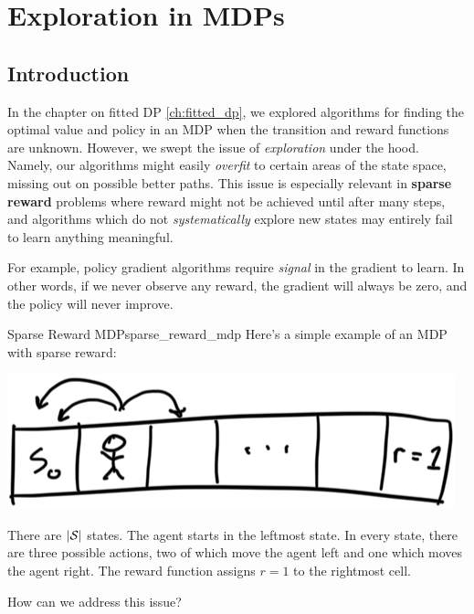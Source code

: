 \documentclass[\main/main]{subfiles}
\begin{document}
\tableofcontents

\chapter{Exploration in MDPs}

\section{Introduction}

In the chapter on fitted DP \eqref{ch:fitted_dp}, we explored algorithms for finding the optimal value and policy in an MDP when the transition and reward functions are unknown.
However, we swept the issue of \emph{exploration} under the hood.
Namely, our algorithms might easily \emph{overfit} to certain areas of the state space,
missing out on possible better paths.
This issue is especially relevant in \textbf{sparse reward} problems where reward might not be achieved until after many steps,
and algorithms which do not \emph{systematically} explore new states may entirely fail to learn anything meaningful.

For example, policy gradient algorithms require \emph{signal} in the gradient to learn. In other words, if we never observe any reward, the gradient will always be zero, and the policy will never improve.

\begin{example}{Sparse Reward MDP}{sparse_reward_mdp}
    Here's a simple example of an MDP with sparse reward:

    \begin{center}
        \includegraphics{sparse_reward_mdp}
    \end{center}

    There are $|\S|$ states.
    The agent starts in the leftmost state.
    In every state, there are three possible actions, two of which move the agent left and one which moves the agent right. The reward function assigns $r=1$ to the rightmost cell.
\end{example}

How can we address this issue?
\end{document}
